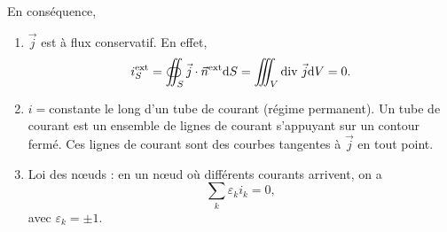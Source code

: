         En conséquence, 
        \begin{enumerate}[label=(\roman*)]
            \item $\vec{j}$ est à flux conservatif. En effet,
            \begin{equation}
                i_S^{\text{ext}}=\oiint_{S}\vec{j}\cdot\vec{n}^{\text{ext}}\mathrm{d} S=\iiint_{V}\mathrm{div}~\vec{j}\mathrm{d} V=0.
            \end{equation}
            \item $i=$constante le long d'un tube de courant (régime permanent). Un tube de courant est un ensemble de lignes de courant s'appuyant sur un contour fermé. Ces lignes de courant sont des courbes tangentes à $\vec{j}$ en tout point.
            \item Loi des n\oe uds : en un n\oe ud où différents courants arrivent, on a 
            \begin{equation}
                \boxed{
                    \sum_{k}\varepsilon_{k}i_k=0,
                }
            \end{equation}
            avec $\varepsilon_{k}=\pm1$.
        \end{enumerate}